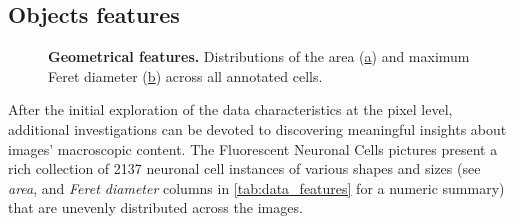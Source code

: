 \subsection{Objects features}
\begin{figure}
    \centering
    \caption{\textbf{Geometrical features.} Distributions of the area (\hyperref[fig:dataset:geom:area]{a}) and maximum Feret diameter (\hyperref[fig:dataset:geom:feret]{b}) across all annotated cells.}
    \label{fig:dataset:geom}
\end{figure}
After the initial exploration of the data characteristics at the pixel level, additional investigations can be devoted to discovering meaningful insights about images' macroscopic content.
The Fluorescent Neuronal Cells pictures present a rich collection of 2137 neuronal cell instances of various shapes and sizes (see \textit{area}, and \textit{Feret diameter} columns in \cref{tab:data_features} for a numeric summary) that are unevenly distributed across the images.

